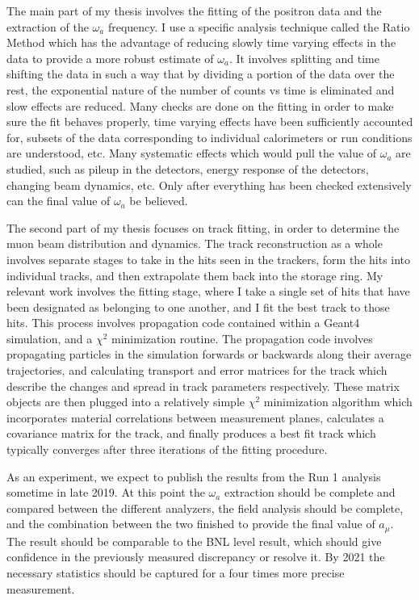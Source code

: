 \documentclass[12pt,letterpaper]{article}
\def\wa{$\omega_{a}$\xspace}
\def\chisq{$\chi^{2}$\xspace}
\def\amu{$a_{\mu}$\xspace}
\begin{document}
The main part of my thesis involves the fitting of the positron data and the extraction of the \wa frequency. I use a specific analysis technique called the Ratio Method which has the advantage of reducing slowly time varying effects in the data to provide a more robust estimate of \wa. It involves splitting and time shifting the data in such a way that by dividing a portion of the data over the rest, the exponential nature of the number of counts vs time is eliminated and slow effects are reduced. Many checks are done on the fitting in order to make sure the fit behaves properly, time varying effects have been sufficiently accounted for, subsets of the data corresponding to individual calorimeters or run conditions are understood, etc. Many systematic effects which would pull the value of \wa are studied, such as pileup in the detectors, energy response of the detectors, changing beam dynamics, etc. Only after everything has been checked extensively can the final value of \wa be believed. 


The second part of my thesis focuses on track fitting, in order to determine the muon beam distribution and dynamics. The track reconstruction as a whole involves separate stages to take in the hits seen in the trackers, form the hits into individual tracks, and then extrapolate them back into the storage ring. My relevant work involves the fitting stage, where I take a single set of hits that have been designated as belonging to one another, and I fit the best track to those hits. This process involves propagation code contained within a Geant4 simulation, and a \chisq minimization routine. The propagation code involves propagating particles in the simulation forwards or backwards along their average trajectories, and calculating transport and error matrices for the track which describe the changes and spread in track parameters respectively. These matrix objects are then plugged into a relatively simple \chisq minimization algorithm which incorporates material correlations between measurement planes, calculates a covariance matrix for the track, and finally produces a best fit track which typically converges after three iterations of the fitting procedure.


As an experiment, we expect to publish the results from the Run 1 analysis sometime in late 2019. At this point the \wa extraction should be complete and compared between the different analyzers, the field analysis should be complete, and the combination between the two finished to provide the final value of \amu. The result should be comparable to the BNL level result, which should give confidence in the previously measured discrepancy or resolve it. By 2021 the necessary statistics should be captured for a four times more precise measurement.
\end{document}
